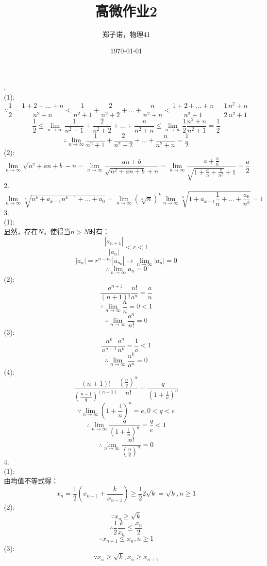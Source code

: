 \documentclass[utf8]{ctexart}
\title{高微作业2}
\author{郑子诺，物理41}
\date{\today}
\begin{document}
\maketitle
{}.\\
(1):\\
\[\because\frac{1}{2}=\frac{1+2+\dots+n}{n^2+n}<\frac{1}{n^2+1}+\frac{2}{n^2+2}+\dots+\frac{n}{n^2+n}<\frac{1+2+\dots+n}{n^2+1}=\frac{1}{2}\frac{n^2+n}{n^2+1}\]
\[\frac{1}{2}\le\lim_{n\rightarrow\infty}\frac{1}{n^2+1}+\frac{2}{n^2+2}+\dots+\frac{n}{n^2+n}\le\lim_{n\rightarrow\infty}\frac{1}{2}\frac{n^2+n}{n^2+1}=\frac{1}{2}\]
\[\therefore\lim_{n\rightarrow\infty}\frac{1}{n^2+1}+\frac{2}{n^2+2}+\dots+\frac{n}{n^2+n}=\frac{1}{2}\]
(2):\\
\[\lim_{n\rightarrow\infty}\sqrt{n^2+an+b}-n=\lim_{n\rightarrow\infty}\frac{an+b}{\sqrt{n^2+an+b}+n}=\lim_{n\rightarrow\infty}\frac{a+\frac{b}{n}}{\sqrt{1+\frac{a}{n}+\frac{b}{n^2}}+1}=\frac{a}{2}\]
2.\\
\[\lim_{n\rightarrow\infty}\sqrt[n]{n^k+a_{k-1}n^{k-1}+\dots+a_0}=\lim_{n\rightarrow\infty}(\sqrt[n]{n})^k\lim_{n\rightarrow\infty}\sqrt[n]{1+a_{k-1}\frac{1}{n}+\dots+\frac{a_0}{n^k}}=1\]
3.\\
(1):\\
显然，存在$N$，使得当$n>N$时有：
\[\frac{|a_{n+1}|}{|a_n|}<r<1\]
\[|a_n|=r^{n-n_0}|a_{n_0}|\rightarrow\lim_{n\rightarrow\infty}|a_n|=0\]
\[\therefore\lim_{n\rightarrow\infty}a_n=0\]
(2):\\
\[\frac{a^{n+1}}{(n+1)!}\frac{n!}{a^n}=\frac{a}{n}\]
\[\because\lim_{n\rightarrow\infty}\frac{a}{n}=0<1\]
\[\therefore\lim_{n\rightarrow\infty}\frac{a^n}{n!}=0\]
(3):\\
\[\frac{n^k}{a^{n+1}}\frac{a^n}{n^k}=\frac{1}{a}<1\]
\[\therefore\lim_{n\rightarrow\infty}\frac{n^k}{a^n}=0\]
(4):\\
\[\frac{(n+1)!}{(\frac{n+1}{q})^(n+1)}\frac{(\frac{n}{q})^n}{n!}=\frac{q}{(1+\frac{1}{n})^n}\]
\[\because\lim_{n\rightarrow\infty}(1+\frac{1}{n})^n=e,0<q<e\]
\[\therefore\lim_{n\rightarrow\infty}\frac{q}{(1+\frac{1}{n})^n}=\frac{q}{e}<1\]
\[\therefore\lim_{n\rightarrow\infty}\frac{n!}{(\frac{n}{q})^n}=0\]
4.\\
(1):\\
由均值不等式得：
\[x_{n}=\frac{1}{2}(x_{n-1}+\frac{k}{x_{n-1}})\ge\frac{1}{2}2\sqrt{k}=\sqrt{k},n\ge1\]
(2):\\
\[\because x_n\ge\sqrt{k}\]
\[\therefore\frac{1}{2}\frac{k}{x_n}\le\frac{x_n}{2}\]
\[\therefore x_{n+1}\le x_n,n\ge1\]
(3):\\
\[\because x_n\ge\sqrt{k},x_n\ge x_{n+1}\]
\end{document}
